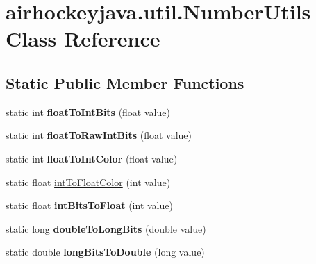 \hypertarget{classairhockeyjava_1_1util_1_1_number_utils}{}\section{airhockeyjava.\+util.\+Number\+Utils Class Reference}
\label{classairhockeyjava_1_1util_1_1_number_utils}
\subsection*{Static Public Member Functions}
\begin{DoxyCompactItemize}
\item 
\hypertarget{classairhockeyjava_1_1util_1_1_number_utils_a5ed83b1f1781602b4dd73192bf8174d4}{}static int {\bfseries float\+To\+Int\+Bits} (float value)\label{classairhockeyjava_1_1util_1_1_number_utils_a5ed83b1f1781602b4dd73192bf8174d4}

\item 
\hypertarget{classairhockeyjava_1_1util_1_1_number_utils_a4c490adc0c32c7301651787d11c75bd9}{}static int {\bfseries float\+To\+Raw\+Int\+Bits} (float value)\label{classairhockeyjava_1_1util_1_1_number_utils_a4c490adc0c32c7301651787d11c75bd9}

\item 
\hypertarget{classairhockeyjava_1_1util_1_1_number_utils_a6e0afdea91c6b0c0bf3b6f879c6566d5}{}static int {\bfseries float\+To\+Int\+Color} (float value)\label{classairhockeyjava_1_1util_1_1_number_utils_a6e0afdea91c6b0c0bf3b6f879c6566d5}

\item 
static float \hyperlink{classairhockeyjava_1_1util_1_1_number_utils_ae0482ec6ce04cbf04cb9fd2799c153e2}{int\+To\+Float\+Color} (int value)
\item 
\hypertarget{classairhockeyjava_1_1util_1_1_number_utils_a01f777cf5db01faf2eac87dbbe953071}{}static float {\bfseries int\+Bits\+To\+Float} (int value)\label{classairhockeyjava_1_1util_1_1_number_utils_a01f777cf5db01faf2eac87dbbe953071}

\item 
\hypertarget{classairhockeyjava_1_1util_1_1_number_utils_a1df3ad6bfd4abc4c61fd291f6110833b}{}static long {\bfseries double\+To\+Long\+Bits} (double value)\label{classairhockeyjava_1_1util_1_1_number_utils_a1df3ad6bfd4abc4c61fd291f6110833b}

\item 
\hypertarget{classairhockeyjava_1_1util_1_1_number_utils_a9de2d493d327b286e96ce46f6a86e9bc}{}static double {\bfseries long\+Bits\+To\+Double} (long value)\label{classairhockeyjava_1_1util_1_1_number_utils_a9de2d493d327b286e96ce46f6a86e9bc}

\end{DoxyCompactItemize}
